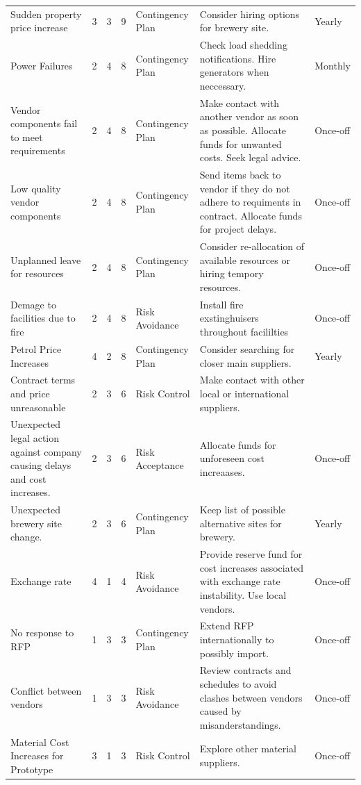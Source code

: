 \begin{appendices}
\begin{landscape}
\begin{table}[H]
{\begin{tabular}{lllllll}
Sudden property price increase & 3 & 3 & \cellcolor[HTML]{F8FF00}9 & Contingency Plan & Consider hiring options for brewery site. & Yearly \\
Power Failures & 2 & 4 & \cellcolor[HTML]{F8FF00}8 & Contingency Plan & Check load shedding notifications. Hire generators when neccessary. & Monthly \\
Vendor components fail to meet requirements & 2 & 4 & \cellcolor[HTML]{F8FF00}8 & Contingency Plan & Make contact with another vendor as soon as possible. Allocate funds for unwanted costs. Seek legal advice. & Once-off \\
Low quality vendor components & 2 & 4 & \cellcolor[HTML]{F8FF00}8 & Contingency Plan & Send items back to vendor if they do not adhere to requiments in contract. Allocate funds for project delays. & Once-off \\
Unplanned leave for resources & 2 & 4 & \cellcolor[HTML]{F8FF00}8 & Contingency Plan & Consider re-allocation of available resources or hiring tempory resources. & Once-off \\
Demage to facilities due to fire & 2 & 4 & \cellcolor[HTML]{F8FF00}8 & Risk Avoidance & Install fire exstinghuisers throughout facililties & Once-off \\
Petrol Price Increases & 4 & 2 & \cellcolor[HTML]{F8FF00}8 & Contingency Plan & Consider searching for closer main suppliers. & Yearly \\
Contract terms and price unreasonable & 2 & 3 & \cellcolor[HTML]{F8FF00}6 & Risk Control & Make contact with other local or international suppliers. &  \\
Unexpected legal action against company causing delays and cost increases. & 2 & 3 & \cellcolor[HTML]{F8FF00}6 & Risk Acceptance & Allocate funds for unforeseen cost increaases. & Once-off \\
Unexpected brewery site change. & 2 & 3 & \cellcolor[HTML]{F8FF00}6 & Contingency Plan & Keep list of possible alternative sites for brewery. & Yearly \\
Exchange rate & 4 & 1 & \cellcolor[HTML]{34FF34}4 & Risk Avoidance & Provide reserve fund for cost increases associated with exchange rate instability. Use local vendors. & Once-off \\
No response to RFP & 1 & 3 & \cellcolor[HTML]{34FF34}3 & Contingency Plan & Extend RFP internationally to possibly import. & Once-off \\
Conflict between vendors & 1 & 3 & \cellcolor[HTML]{34FF34}3 & Risk Avoidance & Review contracts and schedules to avoid clashes between vendors caused by misanderstandings. & Once-off \\
Material Cost Increases for Prototype & 3 & 1 & \cellcolor[HTML]{34FF34}3 & Risk Control & Explore other material suppliers. & Once-off
\end{tabular}%
}
\end{table}


\end{landscape}
\end{appendices}
